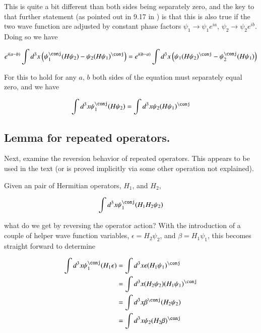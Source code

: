 This is quite a bit different than both sides being separately zero, and the key to that further statement (as pointed out in 9.17 in \citep{bohm1989qt}) 
is that this is also true if the two wave function are adjusted by constant phase factors
$\psi_1 \rightarrow \psi_1 e^{ia}$, 
$\psi_2 \rightarrow \psi_2 e^{ib}$.  Doing so we have

\begin{align*}
e^{i(a-b)} \int d^3 x \left( \psi_1^\conj (H \psi_2) - \psi_2 (H \psi_1)^\conj \right) = e^{i(b-a)} \int d^3 x \left( \psi_1 (H \psi_2)^\conj - \psi_2^\conj (H \psi_1) \right)
\end{align*}

For this to hold for any $a$, $b$ both sides of the equation must separately equal zero, and we have

\begin{align}\label{eqn:commutator_herm:HermitianTwo}
\int d^3 x \psi_1^\conj (H \psi_2) = \int d^3 x \psi_2 (H \psi_1)^\conj
\end{align}

\subsection{Lemma for repeated operators. }

Next, examine the reversion behavior of repeated operators.  This appears to be used in the text (or is proved implicitly via some other operation not explained).

Given an pair of Hermitian operators, $H_1$, and $H_2$, 

\begin{align*}
\int d^3 x \psi_1^\conj (H_1 H_2 \psi_2)
\end{align*}

what do we get by reversing the operator action?  With the introduction of a couple of helper wave function variables, $\epsilon = H_2 \psi_2$, and $\beta = H_1 \psi_1$, 
this becomes straight forward to determine

\begin{align*}
\int d^3 x \psi_1^\conj (H_1 \epsilon)
&=
\int d^3 x \epsilon (H_1 \psi_1)^\conj \\
&=
\int d^3 x (H_2 \psi_2) (H_1 \psi_1)^\conj \\
&=
\int d^3 x \beta^\conj (H_2 \psi_2) \\
&=
\int d^3 x \psi_2 (H_2 \beta)^\conj \\
\end{align*}

